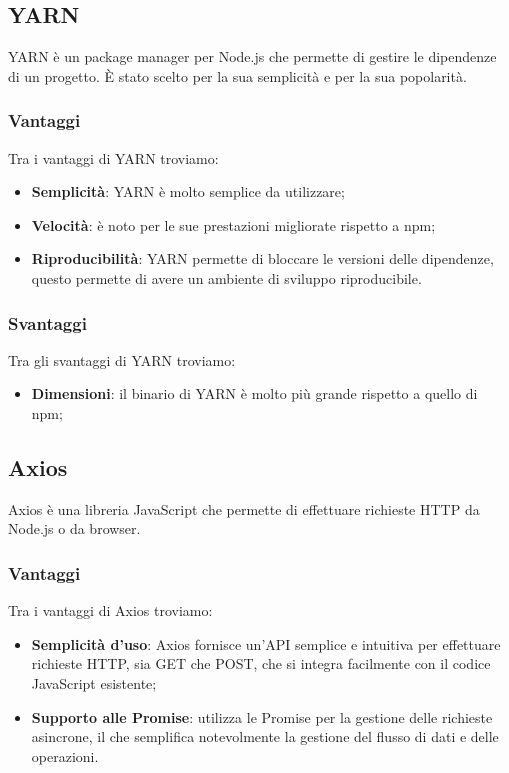 \subsection*{YARN}
YARN è un package manager per Node.js che permette di gestire le dipendenze di un progetto. È stato scelto per la sua semplicità e per la sua popolarità.

\subsubsection*{Vantaggi}
Tra i vantaggi di YARN troviamo:
\begin{itemize}
    \item \textbf{Semplicità}: YARN è molto semplice da utilizzare;
    \item \textbf{Velocità}: è noto per le sue prestazioni migliorate rispetto a npm;
    \item \textbf{Riproducibilità}: YARN permette di bloccare le versioni delle dipendenze, questo permette di avere un ambiente di sviluppo riproducibile.
\end{itemize}

\subsubsection*{Svantaggi}
Tra gli svantaggi di YARN troviamo:
\begin{itemize}
    \item \textbf{Dimensioni}: il binario di YARN è molto più grande rispetto a quello di npm;
\end{itemize}


\subsection*{Axios}
Axios è una libreria JavaScript che permette di effettuare richieste HTTP da Node.js o da browser.

\subsubsection*{Vantaggi}
Tra i vantaggi di Axios troviamo:
\begin{itemize}
    \item \textbf{Semplicità d'uso}: Axios fornisce un'API semplice e intuitiva per effettuare richieste HTTP, sia GET che POST, che si integra facilmente con il codice JavaScript esistente;
    \item \textbf{Supporto alle Promise}: utilizza le Promise per la gestione delle richieste asincrone, il che semplifica notevolmente la gestione del flusso di dati e delle operazioni.
\end{itemize}

